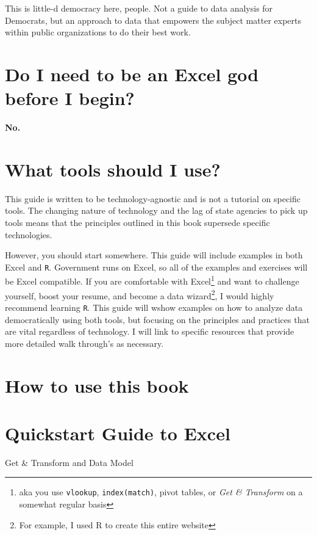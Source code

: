 \documentclass[]{book}
\begin{document}
This is little-d democracy here, people. Not a guide to data analysis
for Democrats, but an approach to data that empowers the subject matter
experts within public organizations to do their best work.

\section{Do I need to be an Excel god before I
begin?}\label{do-i-need-to-be-an-excel-god-before-i-begin}

\textbf{No.}

\section{What tools should I use?}\label{what-tools-should-i-use}

This guide is written to be technology-agnostic and is not a tutorial on
specific tools. The changing nature of technology and the lag of state
agencies to pick up tools means that the principles outlined in this
book supersede specific technologies.

However, you should start somewhere. This guide will include examples in
both Excel and \texttt{R}. Government runs on Excel, so all of the
examples and exercises will be Excel compatible. If you are comfortable
with Excel\footnote{aka you use \texttt{vlookup}, \texttt{index(match)},
  pivot tables, or \emph{Get \& Transform} on a somewhat regular basis}
and want to challenge yourself, boost your resume, and become a data
wizard\footnote{For example, I used R to create this entire website}, I
would highly recommend learning \texttt{R}. This guide will wshow
examples on how to analyze data democratically using both tools, but
focusing on the principles and practices that are vital regardless of
technology. I will link to specific resources that provide more detailed
walk through's as necessary.

\section{How to use this book}\label{how-to-use-this-book}

\section{Quickstart Guide to Excel}\label{quickstart-guide-to-excel}

Get \& Transform and Data Model
\end{document}
